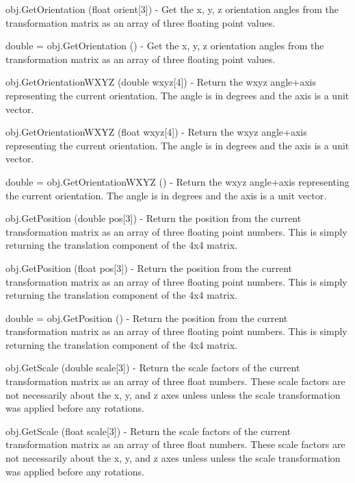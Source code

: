 \begin{DoxyItemize}
\item {\ttfamily obj.\-Get\-Orientation (float orient\mbox{[}3\mbox{]})} -\/ Get the x, y, z orientation angles from the transformation matrix as an array of three floating point values.  
\item {\ttfamily double = obj.\-Get\-Orientation ()} -\/ Get the x, y, z orientation angles from the transformation matrix as an array of three floating point values.  
\item {\ttfamily obj.\-Get\-Orientation\-W\-X\-Y\-Z (double wxyz\mbox{[}4\mbox{]})} -\/ Return the wxyz angle+axis representing the current orientation. The angle is in degrees and the axis is a unit vector.  
\item {\ttfamily obj.\-Get\-Orientation\-W\-X\-Y\-Z (float wxyz\mbox{[}4\mbox{]})} -\/ Return the wxyz angle+axis representing the current orientation. The angle is in degrees and the axis is a unit vector.  
\item {\ttfamily double = obj.\-Get\-Orientation\-W\-X\-Y\-Z ()} -\/ Return the wxyz angle+axis representing the current orientation. The angle is in degrees and the axis is a unit vector.  
\item {\ttfamily obj.\-Get\-Position (double pos\mbox{[}3\mbox{]})} -\/ Return the position from the current transformation matrix as an array of three floating point numbers. This is simply returning the translation component of the 4x4 matrix.  
\item {\ttfamily obj.\-Get\-Position (float pos\mbox{[}3\mbox{]})} -\/ Return the position from the current transformation matrix as an array of three floating point numbers. This is simply returning the translation component of the 4x4 matrix.  
\item {\ttfamily double = obj.\-Get\-Position ()} -\/ Return the position from the current transformation matrix as an array of three floating point numbers. This is simply returning the translation component of the 4x4 matrix.  
\item {\ttfamily obj.\-Get\-Scale (double scale\mbox{[}3\mbox{]})} -\/ Return the scale factors of the current transformation matrix as an array of three float numbers. These scale factors are not necessarily about the x, y, and z axes unless unless the scale transformation was applied before any rotations.  
\item {\ttfamily obj.\-Get\-Scale (float scale\mbox{[}3\mbox{]})} -\/ Return the scale factors of the current transformation matrix as an array of three float numbers. These scale factors are not necessarily about the x, y, and z axes unless unless the scale transformation was applied before any rotations.  

\end{DoxyItemize}
